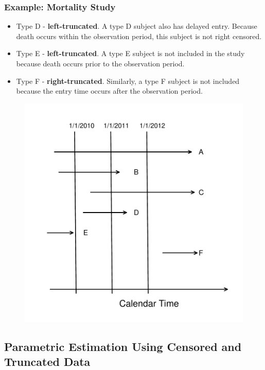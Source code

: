 \documentclass{beamer}
\begin{document}
\begin{frame}%
\frametitle{Example: Mortality Study}
\begin{itemize}
\item Type D - \textbf{left-truncated}. A type D subject also has delayed entry. Because death occurs within the observation period, this subject is not right censored.
\item Type E - \textbf{left-truncated}. A type E subject is not included in the study because death occurs prior to the observation period.
\item Type F - \textbf{right-truncated}. Similarly, a type F subject is not included because the entry time occurs after the observation period.
\end{itemize}
\vspace{-.1in}
\begin{figure}[htp]
  \begin{center}
    \includegraphics[width=.5\textwidth]{Figures/F14Mortality.pdf}
  \end{center}
\end{figure}
\end{frame}


\subsection{Parametric Estimation Using Censored and Truncated Data}
\end{document}
